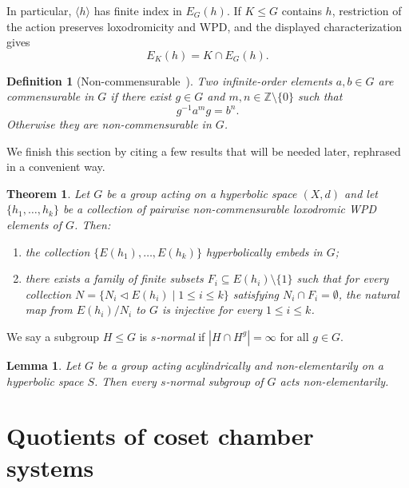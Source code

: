 \documentclass[10pt,a4paper]{amsart}
\newtheorem{thm}[prop]{Theorem}
\newtheorem{lemma}[prop]{Lemma}
\newtheorem{definition}[prop]{Definition}
\newcommand{\ZZ}{\mathbb{Z}}
\begin{document}
In particular, $\langle h\rangle$ has finite index in $E_G(h)$.
If $K\leq G$ contains $h$, restriction of the action preserves
loxodromicity and WPD, and the displayed characterization gives
\[
    E_K(h)=K\cap E_G(h).
\]

\begin{definition}[Non-commensurable~{\cite[Section~2]{hull2017small}}]
\label{def:commensurable}
Two infinite-order elements $a,b\in G$ are \emph{commensurable in $G$} if
there exist $g\in G$ and $m,n\in\ZZ\setminus\{0\}$ such that
\[
    g^{-1}a^m g=b^n.
\]
Otherwise they are \emph{non-commensurable in $G$}.
\end{definition}

We finish this section by citing a few results that will be needed later, rephrased in a convenient way.

\begin{thm}\cite[Theorem 6.8 and Theorem 7.19, adapted]{DGO}\label{thm:DGO_thms}
    Let $G$ be a group acting on a hyperbolic space $(X,d)$ and let $\{h_1,\ldots,h_k\}$ be a collection of pairwise non-commensurable loxodromic WPD elements of $G$. Then:
    \begin{enumerate}
        \item the collection $\{E(h_1),\ldots,E(h_k)\}$ hyperbolically embeds in $G$;
        \item there exists a family of finite subsets $F_i\subseteq E(h_i)\setminus \{1\}$ such that for every collection $N=\{N_i \triangleleft E(h_i)\mid 1\leq i\leq k\}$ satisfying $N_i \cap F_i=\emptyset$, the natural map from $E(h_i)/N_i$ to $G$ is injective for every $1\leq i \leq k$.
    \end{enumerate}
\end{thm}

We say a subgroup $H\leq G$ is \emph{$s$-normal} if $|H\cap H^g|=\infty$ for all $g\in G$.
\begin{lemma}\cite[Lemma 7.1]{OsinAcylindrical}\label{lem:snormal_non_elem}
    Let $G$ be a group acting acylindrically and non-elementarily on a hyperbolic space $S$. Then every $s$-normal subgroup of $G$ acts non-elementarily.
\end{lemma}



\section{Quotients of coset chamber systems} \label{sec:quotientChamberSystems}
\end{document}
